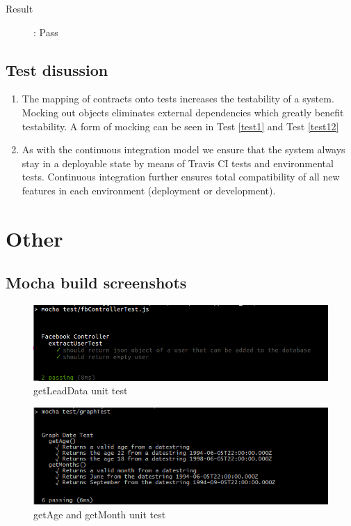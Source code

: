 \documentclass{article}
\begin{document}
\begin{description}
	\item [Result]: Pass 
\end{description}

\subsection{Test disussion}	
\begin{enumerate}
	\item The mapping of contracts onto tests increases the testability of a system. Mocking out objects eliminates external dependencies which greatly benefit testability. A form of mocking can be seen in Test \ref{test1} and Test \ref{test12}
	\item As with the continuous integration model we ensure that the system always stay in a deployable state by means of Travis CI tests and environmental tests. Continuous integration further ensures total compatibility of all new features in each environment (deployment or development).
\end{enumerate}




\pagebreak
\section{Other}

	\subsection{Mocha build screenshots}
	
	\begin{figure}[H]
	\includegraphics[width=15cm]{images/FbControllerTest.png}
	\caption{getLeadData unit test}
	\end{figure}
	
	
	\begin{figure}[H]
	\includegraphics[width=15cm]{images/getAge.png}
	\caption{getAge and getMonth unit test}
	\end{figure}
	
\end{document}
